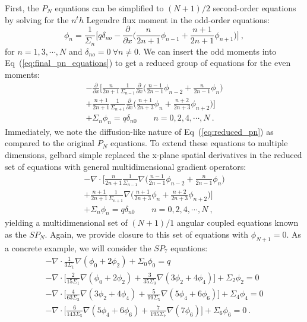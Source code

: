 \documentclass[letterpaper,12pt]{article}
\begin{document}
First, the $P_N$ equations can be simplified to $(N+1)/2$ second-order
equations by solving for the $n^th$ Legendre flux moment in the
odd-order equations:
\begin{equation}
  \phi_n = \frac{1}{\Sigma_n}\Bigg[ q \delta_{no} -
    \frac{\partial}{\partial x}\Big(\frac{n}{2n+1}\phi_{n-1} +
    \frac{n+1}{2n+1} \phi_{n+1} \Big) \Bigg]\:, 
  \label{eq:odd_moments}
\end{equation}
for $n = 1,3,\cdots,N$ and $\delta_{no} = 0\ \forall n \neq 0$. We can
insert the odd moments into Eq~(\ref{eq:final_pn_equations}) to get a
reduced group of equations for the even moments:
\begin{multline}
  -\frac{\partial}{\partial x}
  \Bigg[\frac{n}{2n+1}\frac{1}{\Sigma_{n-1}} \frac{\partial}{\partial
      x} \Big(\frac{n-1}{2n-1} \phi_{n-2} + \frac{n}{2n-1}\phi_n \Big)
    \\+ \frac{n+1}{2n+1}\frac{1}{\Sigma_{n+1}} \frac{\partial}{\partial
      x} \Big(\frac{n+1}{2n+3}\phi_n + \frac{n+2}{2n+3}\phi_{n+2}\Big)
    \Bigg] \\+ \Sigma_n \phi_n = q \delta_{n0}\ \ \ \ \ \ \ \ \ n =
  0,2,4,\cdots,N\:.
  \label{eq:reduced_pn}
\end{multline}
Immediately, we note the diffusion-like nature of
Eq~(\ref{eq:reduced_pn}) as compared to the original $P_N$
equations. To extend these equations to multiple dimensions, gelbard
simple replaced the x-plane spatial derivatives in the reduced set of
equations with general multidimensional gradient operators:
\begin{multline}
  -\nabla \cdot \Bigg[\frac{n}{2n+1}\frac{1}{\Sigma_{n-1}} \nabla
    \Big(\frac{n-1}{2n-1} \phi_{n-2} + \frac{n}{2n-1}\phi_n \Big) \\+
    \frac{n+1}{2n+1}\frac{1}{\Sigma_{n+1}} \nabla
    \Big(\frac{n+1}{2n+3}\phi_n + \frac{n+2}{2n+3}\phi_{n+2}\Big)
    \Bigg] \\+ \Sigma_n \phi_n = q \delta_{n0}\ \ \ \ \ \ \ \ \ n =
  0,2,4,\cdots,N\:,
  \label{eq:spn_equations}
\end{multline}
yielding a multidimensional set of $(N+1)/1$ angular coupled equations
known as the $SP_N$. Again, we provide closure to this set of
equations with $\phi_{N+1} = 0$. As a concrete example, we will
consider the $SP_7$ equations:
\begin{subequations}
  \begin{gather}
    -\nabla \cdot \frac{1}{3 \Sigma_1} \nabla ( \phi_0 + 2\phi_2 ) +
    \Sigma_0 \phi_0 = q \\ 
    -\nabla \cdot \Bigg[ \frac{2}{15 \Sigma_1} \nabla ( \phi_0 + 2\phi_2
      ) + \frac{3}{35 \Sigma_3}\nabla( 3\phi_2 + 4\phi_4)\Bigg] +
    \Sigma_2 \phi_2 = 0\\
    -\nabla \cdot \Bigg[ \frac{4}{63 \Sigma_3} \nabla ( 3\phi_2 +
      4\phi_4 ) + \frac{5}{99 \Sigma_5}\nabla( 5\phi_4 +
      6\phi_6)\Bigg] + \Sigma_4 \phi_4 = 0\\
    -\nabla \cdot \Bigg[ \frac{6}{143 \Sigma_5} \nabla ( 5\phi_4 +
      6\phi_6 ) + \frac{7}{195 \Sigma_7}\nabla(7\phi_6)\Bigg] +
    \Sigma_6 \phi_6 = 0 \:.
  \end{gather}
  \label{eq:sp7_equations}
\end{subequations}
\end{document}

